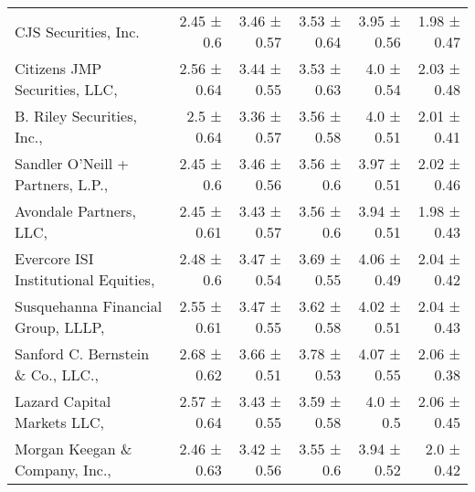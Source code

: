 \begin{tabular}{lrrrrr}
CJS Securities, Inc. & 2.45 ± 0.6 & 3.46 ± 0.57 & 3.53 ± 0.64 & 3.95 ± 0.56 & 1.98 ± 0.47 \\
Citizens JMP Securities, LLC,  & 2.56 ± 0.64 & 3.44 ± 0.55 & 3.53 ± 0.63 & 4.0 ± 0.54 & 2.03 ± 0.48 \\
B. Riley Securities, Inc.,  & 2.5 ± 0.64 & 3.36 ± 0.57 & 3.56 ± 0.58 & 4.0 ± 0.51 & 2.01 ± 0.41 \\
Sandler O'Neill + Partners, L.P.,  & 2.45 ± 0.6 & 3.46 ± 0.56 & 3.56 ± 0.6 & 3.97 ± 0.51 & 2.02 ± 0.46 \\
Avondale Partners, LLC,  & 2.45 ± 0.61 & 3.43 ± 0.57 & 3.56 ± 0.6 & 3.94 ± 0.51 & 1.98 ± 0.43 \\
Evercore ISI Institutional Equities,  & 2.48 ± 0.6 & 3.47 ± 0.54 & 3.69 ± 0.55 & 4.06 ± 0.49 & 2.04 ± 0.42 \\
Susquehanna Financial Group, LLLP,  & 2.55 ± 0.61 & 3.47 ± 0.55 & 3.62 ± 0.58 & 4.02 ± 0.51 & 2.04 ± 0.43 \\
Sanford C. Bernstein \& Co., LLC.,  & 2.68 ± 0.62 & 3.66 ± 0.51 & 3.78 ± 0.53 & 4.07 ± 0.55 & 2.06 ± 0.38 \\
Lazard Capital Markets LLC,  & 2.57 ± 0.64 & 3.43 ± 0.55 & 3.59 ± 0.58 & 4.0 ± 0.5 & 2.06 ± 0.45 \\
Morgan Keegan \& Company, Inc.,  & 2.46 ± 0.63 & 3.42 ± 0.56 & 3.55 ± 0.6 & 3.94 ± 0.52 & 2.0 ± 0.42 \\
\bottomrule
\end{tabular}
